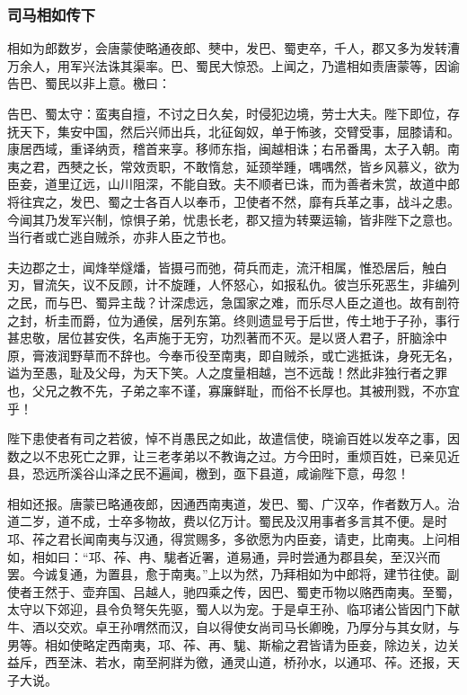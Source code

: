 \documentclass[]{article}
\begin{document}
\hypertarget{header-n4572}{%
\subsubsection{司马相如传下}\label{header-n4572}}

相如为郎数岁，会唐蒙使略通夜郎、僰中，发巴、蜀吏卒，千人，郡又多为发转漕万余人，用军兴法诛其渠率。巴、蜀民大惊恐。上闻之，乃遣相如责唐蒙等，因谕告巴、蜀民以非上意。檄曰：

告巴、蜀太守：蛮夷自擅，不讨之日久矣，时侵犯边境，劳士大夫。陛下即位，存抚天下，集安中国，然后兴师出兵，北征匈奴，单于怖骇，交臂受事，屈膝请和。康居西域，重译纳贡，稽首来享。移师东指，闽越相诛；右吊番禺，太子入朝。南夷之君，西僰之长，常效贡职，不敢惰怠，延颈举踵，喁喁然，皆乡风慕义，欲为臣妾，道里辽远，山川阻深，不能自致。夫不顺者已诛，而为善者未赏，故道中郎将往宾之，发巴、蜀之士各百人以奉币，卫使者不然，靡有兵革之事，战斗之患。今闻其乃发军兴制，惊惧子弟，忧患长老，郡又擅为转粟运输，皆非陛下之意也。当行者或亡逃自贼杀，亦非人臣之节也。

夫边郡之士，闻烽举燧燔，皆摄弓而弛，荷兵而走，流汗相属，惟恐居后，触白刃，冒流矢，议不反顾，计不旋踵，人怀怒心，如报私仇。彼岂乐死恶生，非编列之民，而与巴、蜀异主哉？计深虑远，急国家之难，而乐尽人臣之道也。故有剖符之封，析圭而爵，位为通侯，居列东第。终则遗显号于后世，传土地于子孙，事行甚忠敬，居位甚安佚，名声施于无穷，功烈著而不灭。是以贤人君子，肝脑涂中原，膏液润野草而不辞也。今奉币役至南夷，即自贼杀，或亡逃抵诛，身死无名，谥为至愚，耻及父母，为天下笑。人之度量相越，岂不远哉！然此非独行者之罪也，父兄之教不先，子弟之率不谨，寡廉鲜耻，而俗不长厚也。其被刑戮，不亦宜乎！

陛下患使者有司之若彼，悼不肖愚民之如此，故遣信使，晓谕百姓以发卒之事，因数之以不忠死亡之罪，让三老孝弟以不教诲之过。方今田时，重烦百姓，已亲见近县，恐远所溪谷山泽之民不遍闻，檄到，亟下县道，咸谕陛下意，毋忽！

相如还报。唐蒙已略通夜郎，因通西南夷道，发巴、蜀、广汉卒，作者数万人。治道二岁，道不成，士卒多物故，费以亿万计。蜀民及汉用事者多言其不便。是时邛、莋之君长闻南夷与汉通，得赏赐多，多欲愿为内臣妾，请吏，比南夷。上问相如，相如曰：``邛、莋、冉、駹者近署，道易通，异时尝通为郡县矣，至汉兴而罢。今诚复通，为置县，愈于南夷。''上以为然，乃拜相如为中郎将，建节往使。副使者王然于、壶弃国、吕越人，驰四乘之传，因巴、蜀吏币物以赂西南夷。至蜀，太守以下郊迎，县令负弩矢先驱，蜀人以为宠。于是卓王孙、临邛诸公皆因门下献牛、酒以交欢。卓王孙喟然而汉，自以得使女尚司马长卿晚，乃厚分与其女财，与男等。相如使略定西南夷，邛、莋、再、駹、斯榆之君皆请为臣妾，除边关，边关益斥，西至沫、若水，南至牁牂为徼，通灵山道，桥孙水，以通邛、莋。还报，天子大说。
\end{document}

